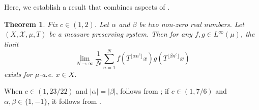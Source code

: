 \documentclass[reqno,12pt]{amsart}
\newtheorem{thm}{Theorem}[section]
\def \N {\mathbb N}
\def \Z {\mathbb Z}
\def \X {\mathcal{X}}
\numberwithin{equation}{section}
\begin{document}
Here, we establish a result that combines aspects of .
\begin{thm}\label{TB}
Fix $c\in (1,2)$. Let $\alpha$ and $\beta$ be two non-zero real numbers. Let $(X,\X,\mu,T)$ be a measure preserving system. Then for any $f,g\in L^{\infty}(\mu)$, the limit
\begin{equation}\label{eq1-3}
	\lim_{N\to\infty}\frac{1}{N}\sum_{n=1}^{N}f(T^{\lfloor \alpha n^c \rfloor}x)g(T^{\lfloor \beta n^c \rfloor}x)
\end{equation}
exists for $\mu$-a.e. $x\in X$. 
\end{thm}
When $c\in (1,23/22)$ and $|\alpha|=|\beta|$,  follows from \cite[Theorem 1.7]{Daskalakis2025}; if $c\in (1,7/6)$ and $\alpha,\beta \in \{1,-1\}$, it follows from \cite[Proposition 1.5]{FornalKrause2026}.
%
%
\end{document}
